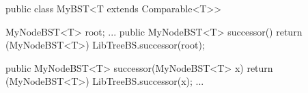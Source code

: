 public class MyBST<T extends Comparable<T>> {
	MyNodeBST<T> root;
	...
	public MyNodeBST<T> successor() {
		return (MyNodeBST<T>) LibTreeBS.successor(root);
	}

	public MyNodeBST<T> successor(MyNodeBST<T> x) {
		return (MyNodeBST<T>) LibTreeBS.successor(x);
	}
	...
}